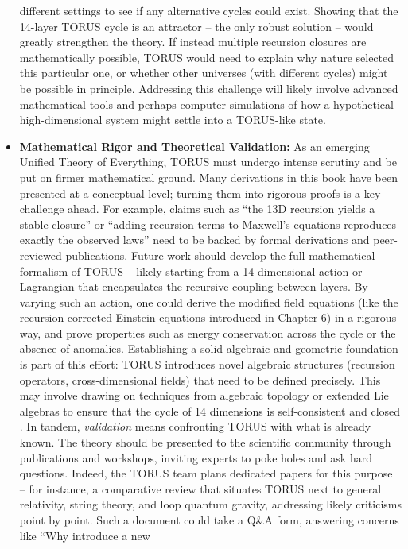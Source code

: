 \documentclass[]{article}
\begin{document}
\begin{itemize}
  different settings to see if any alternative cycles could exist.
  Showing that the 14-layer TORUS cycle is an attractor -- the only
  robust solution -- would greatly strengthen the theory. If instead
  multiple recursion closures are mathematically possible, TORUS would
  need to explain why nature selected this particular one, or whether
  other universes (with different cycles) might be possible in
  principle. Addressing this challenge will likely involve advanced
  mathematical tools and perhaps computer simulations of how a
  hypothetical high-dimensional system might settle into a TORUS-like
  state.
\item
  \textbf{Mathematical Rigor and Theoretical Validation:} As an emerging
  Unified Theory of Everything, TORUS must undergo intense scrutiny and
  be put on firmer mathematical ground. Many derivations in this book
  have been presented at a conceptual level; turning them into rigorous
  proofs is a key challenge ahead​. For example, claims such as ``the
  13D recursion yields a stable closure'' or ``adding recursion terms to
  Maxwell's equations reproduces exactly the observed laws'' need to be
  backed by formal derivations and peer-reviewed publications. Future
  work should develop the full mathematical formalism of TORUS -- likely
  starting from a 14-dimensional action or Lagrangian that encapsulates
  the recursive coupling between layers​. By varying such an action, one
  could derive the modified field equations (like the
  recursion-corrected Einstein equations introduced in Chapter 6) in a
  rigorous way, and prove properties such as energy conservation across
  the cycle or the absence of anomalies. Establishing a solid algebraic
  and geometric foundation is part of this effort: TORUS introduces
  novel algebraic structures (recursion operators, cross-dimensional
  fields) that need to be defined precisely. This may involve drawing on
  techniques from algebraic topology or extended Lie algebras to ensure
  that the cycle of 14 dimensions is self-consistent and closed​. In
  tandem, \emph{validation} means confronting TORUS with what is already
  known. The theory should be presented to the scientific community
  through publications and workshops, inviting experts to poke holes and
  ask hard questions. Indeed, the TORUS team plans dedicated papers for
  this purpose -- for instance, a comparative review that situates TORUS
  next to general relativity, string theory, and loop quantum gravity,
  addressing likely criticisms point by point​. Such a document could
  take a Q\&A form, answering concerns like ``Why introduce a new

\end{itemize}
\end{document}
